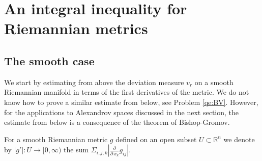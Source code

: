 \documentclass[12pt,leqno]{amsart}
\numberwithin{equation}{section}
\newtheorem{prop}[thm]{PROPOSITION}
\theoremstyle{definition}
\newtheorem{defn}[thm]{Definition}%
\theoremstyle{remark}
\newcommand{\R}{\mathbb{R}}
\def\:{\colon}
\begin{document}





\section{An integral inequality for Riemannian metrics}\label{sec-BV-estimate}
\subsection{The smooth case} We start by estimating from above the deviation measure $v_r$  on a smooth Riemannian manifold in terms of the first
derivatives of the metric.  We do not know how to prove a similar estimate from below, see  Problem \ref{qe:BV}. However, for the applications
to Alexandrov spaces discussed in the next section, the  estimate from below is a consequence of the theorem of Bishop-Gromov.

For a smooth Riemannian metric $g$ defined on an open subset $U\subset \R^n$ we denote by $|g'|:U\to [0,\infty)$ the sum $\Sigma_{i,j,k}|\frac \partial {\partial \,x_k} g_{ij}|$.

\end{document}
